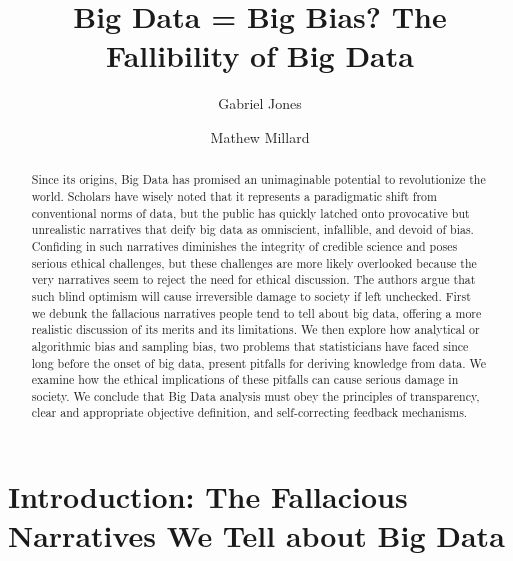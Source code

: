 \documentclass[sigconf]{acmart}
\begin{document}
\title{Big Data = Big Bias? The Fallibility of Big Data}


\author{Gabriel Jones}

\author{Mathew Millard}

\renewcommand{\shortauthors}{G. Jones}


\begin{abstract}
	Since its origins, Big Data has promised an unimaginable potential to revolutionize the world. Scholars have wisely noted that it represents a paradigmatic shift from conventional norms of data, but the public has quickly latched onto provocative but unrealistic narratives that deify big data as omniscient, infallible, and devoid of bias. Confiding in such narratives diminishes the integrity of credible science and poses serious ethical challenges, but these challenges are more likely overlooked because the very narratives seem to reject the need for ethical discussion. The authors argue that such blind optimism will cause irreversible damage to society if left unchecked. First we debunk the fallacious narratives people tend to tell about big data, offering a more realistic discussion of its merits and its limitations. We then explore how analytical or algorithmic bias and sampling bias, two problems that statisticians have faced since long before the onset of big data, present pitfalls for deriving knowledge from data. We examine how the ethical implications of these pitfalls can cause serious damage in society. We conclude that Big Data analysis must obey the principles of transparency, clear and appropriate objective definition, and self-correcting feedback mechanisms.
\end{abstract}


\maketitle

\section{Introduction: The Fallacious Narratives We Tell about Big Data}
\end{document}
